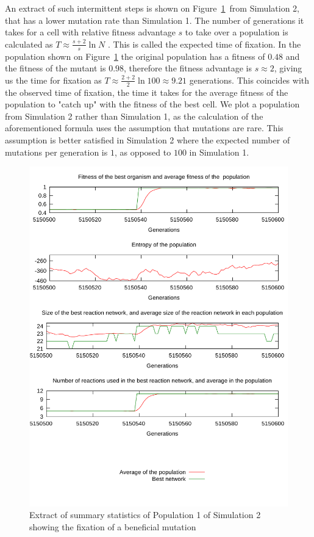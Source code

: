 \documentclass[a4paper,12pt]{article}
\begin{document}
An extract of such intermittent steps is shown on Figure~\ref{fig:fixation}~from Simulation 2, that has a lower mutation rate than Simulation 1. The number of generations it takes for a cell with relative fitness advantage $s$ to take over a population is calculated as $T \approx \frac{s+2}{s}\ln N$ \cite{barteklecture}. This is called the expected time of fixation. In the population shown on Figure~\ref{fig:fixation} the original population has a fitness of $0.48$ and the fitness of the mutant is $0.98$, therefore the fitness advantage is $s\approx2$, giving us the time for fixation as $T\approx \frac{2+2}{2}\ln 100 \approx 9.21$ generations. This coincides with the observed time of fixation, the time it takes for the average fitness of the population to "catch up" with the fitness of the best cell. We plot a population from Simulation 2 rather than Simulation 1, as the calculation of the aforementioned formula uses the assumption that mutations are rare. This assumption is better satisfied in Simulation 2 where the expected number of mutations per generation is $1$, as opposed to $100$ in Simulation 1.

\begin{figure}[htpb]
	\centering
	\includegraphics[width=0.8\linewidth]{fixation.pdf}
	\caption{Extract of summary statistics of Population 1 of Simulation 2 showing the fixation of a beneficial mutation}
	\label{fig:fixation}
\end{figure}
\end{document}
